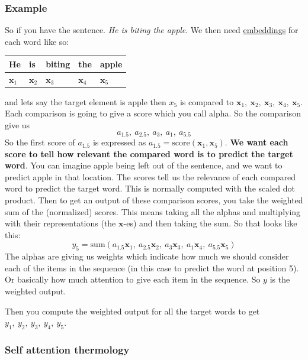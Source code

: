 \documentclass[
  11pt,
  british,
]{article}
\begin{document}
\hypertarget{example-4}{%
\subsubsection{Example}\label{example-4}}

So if you have the sentence. \emph{He is biting the apple}. We then need
\href{../Semantic-Similarity/Embeddings.md}{embeddings} for each word
like so:

\begin{longtable}[]{@{}lllll@{}}
\toprule
He & is & biting & the & apple \\
\midrule
\endhead
\(\mathbf{x}_{1}\) & \(\mathbf{x}_{2}\) & \(\mathbf{x}_3\) &
\(\mathbf{x}_4\) & \(\mathbf{x}_5\) \\
\bottomrule
\end{longtable}

and lets say the target element is apple then \(x_{5}\) is compared to
\(\mathbf{x}_{1},~\mathbf{x}_{2},~\mathbf{x}_{3},~\mathbf{x}_{4},~\mathbf{x}_{5}\).
Each comparison is going to give a score which you call alpha. So the
comparison give us \[a_{1.5},~a_{2.5},~a_{3},~a_{1},~a_{5.5}\] So the
first score of \(a_{1.5}\) is expressed as
\(a_{1.5} = \text{score}(\mathbf{x}_{1}, \mathbf{x}_{5})\). \textbf{We
want each score to tell how relevant the compared word is to predict the
target word}. You can imagine apple being left out of the sentence, and
we want to predict apple in that location. The scores tell us the
relevance of each compared word to predict the target word. This is
normally computed with the scaled dot product. Then to get an output of
these comparison scores, you take the weighted sum of the (normalized)
scores. This means taking all the alphas and multiplying with their
representations (the \(\mathbf{x}\)-es) and then taking the sum. So that
looks like this:
\[y_{5} = \text{sum}(a_{1.5}\mathbf{x}_1,~a_{2.5}\mathbf{x}_{2},~a_{3}\mathbf{x}_{3},~a_{1}\mathbf{x}_{4},~a_{5.5}\mathbf{x}_{5})\]
The alphas are giving us weights which indicate how much we should
consider each of the items in the sequence (in this case to predict the
word at position 5). Or basically how much attention to give each item
in the sequence. So \(y\) is the weighted output.

Then you compute the weighted output for all the target words to get
\(y_{1},~y_{2},~y_{3},~y_{4},~y_{5}\).

\hypertarget{self-attention-thermology}{%
\subsubsection{Self attention
thermology}\label{self-attention-thermology}}
\end{document}
